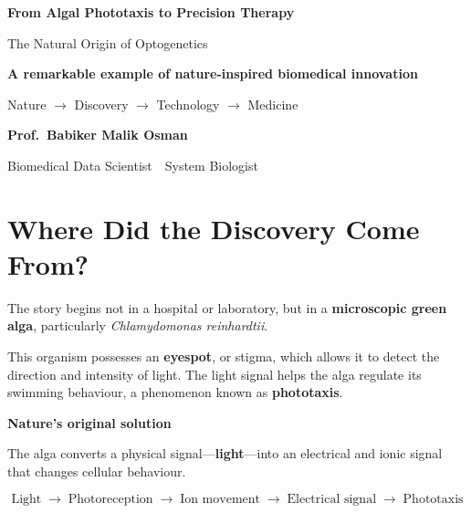 \documentclass[11pt]{article}
\begin{document}
\begin{center}
{\color{Maroon}\fontsize{25}{30}\selectfont\bfseries From Algal Phototaxis to Precision Therapy}
\vspace{0.3cm}

{\color{SteelBlue}\Large The Natural Origin of Optogenetics}
\vspace{0.1cm}

{\color{SlatePurple}\small\bfseries A remarkable example of nature-inspired biomedical innovation}
\vspace{0.1cm}

{\color{SlatePurple}\large Nature $\longrightarrow$ Discovery $\longrightarrow$ Technology $\longrightarrow$ Medicine}

\vspace{0.25cm}

{\color{Maroon}\large\bfseries Prof.\ Babiker Malik Osman}
\vspace{0.1cm}

{\color{SlatePurple}\normalsize Biomedical Data Scientist \,\textbullet\, System Biologist}
\end{center}

\section{Where Did the Discovery Come From?}

The story begins not in a hospital or laboratory, but in a
\textbf{microscopic green alga}, particularly
\textit{Chlamydomonas reinhardtii}.

This organism possesses an \textbf{eyespot}, or stigma, which
allows it to detect the direction and intensity of light.
The light signal helps the alga regulate its swimming behaviour,
a phenomenon known as \textbf{phototaxis}.

\begin{discoverybox}
\textbf{\color{Maroon}Nature's original solution}

The alga converts a physical signal---\textbf{light}---into an
electrical and ionic signal that changes cellular behaviour.
\end{discoverybox}

\begin{center}
\[
\boxed{
\text{Light}
\;\longrightarrow\;
\text{Photoreception}
\;\longrightarrow\;
\text{Ion movement}
\;\longrightarrow\;
\text{Electrical signal}
\;\longrightarrow\;
\text{Phototaxis}
}
\]
\end{center}
\end{document}
